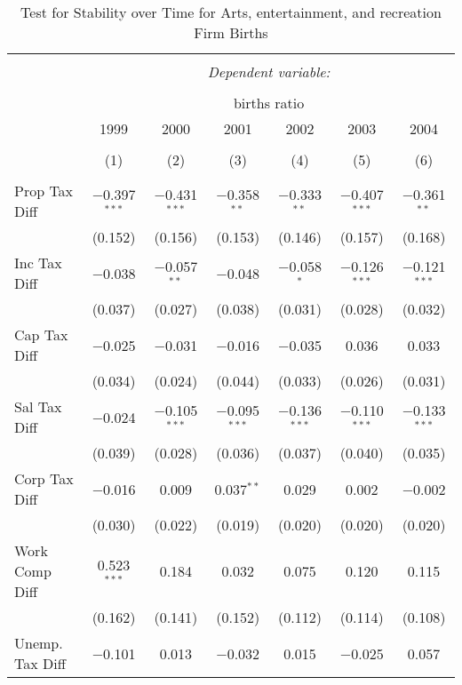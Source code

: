 
\begin{table}[!htbp] \centering 
  \caption{Test for Stability over Time for  Arts, entertainment, and recreation Firm Births} 
  \label{71year} 
\small 
\begin{tabular}{@{\extracolsep{5pt}}lcccccc} 
\\[-1.8ex]\hline 
\hline \\[-1.8ex] 
 & \multicolumn{6}{c}{\textit{Dependent variable:}} \\ 
\cline{2-7} 
\\[-1.8ex] & \multicolumn{6}{c}{births ratio} \\ 
 & 1999 & 2000 & 2001 & 2002 & 2003 & 2004 \\ 
\\[-1.8ex] & (1) & (2) & (3) & (4) & (5) & (6)\\ 
\hline \\[-1.8ex] 
 Prop Tax Diff & $-$0.397$^{***}$ & $-$0.431$^{***}$ & $-$0.358$^{**}$ & $-$0.333$^{**}$ & $-$0.407$^{***}$ & $-$0.361$^{**}$ \\ 
  & (0.152) & (0.156) & (0.153) & (0.146) & (0.157) & (0.168) \\ 
  Inc Tax Diff & $-$0.038 & $-$0.057$^{**}$ & $-$0.048 & $-$0.058$^{*}$ & $-$0.126$^{***}$ & $-$0.121$^{***}$ \\ 
  & (0.037) & (0.027) & (0.038) & (0.031) & (0.028) & (0.032) \\ 
  Cap Tax Diff & $-$0.025 & $-$0.031 & $-$0.016 & $-$0.035 & 0.036 & 0.033 \\ 
  & (0.034) & (0.024) & (0.044) & (0.033) & (0.026) & (0.031) \\ 
  Sal Tax Diff & $-$0.024 & $-$0.105$^{***}$ & $-$0.095$^{***}$ & $-$0.136$^{***}$ & $-$0.110$^{***}$ & $-$0.133$^{***}$ \\ 
  & (0.039) & (0.028) & (0.036) & (0.037) & (0.040) & (0.035) \\ 
  Corp Tax Diff & $-$0.016 & 0.009 & 0.037$^{**}$ & 0.029 & 0.002 & $-$0.002 \\ 
  & (0.030) & (0.022) & (0.019) & (0.020) & (0.020) & (0.020) \\ 
  Work Comp Diff & 0.523$^{***}$ & 0.184 & 0.032 & 0.075 & 0.120 & 0.115 \\ 
  & (0.162) & (0.141) & (0.152) & (0.112) & (0.114) & (0.108) \\ 
  Unemp. Tax Diff & $-$0.101 & 0.013 & $-$0.032 & 0.015 & $-$0.025 & 0.057 \\ 

\end{tabular}
\end{table}
